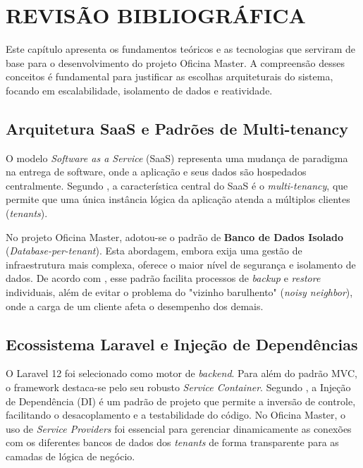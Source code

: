 
\chapter{REVISÃO BIBLIOGRÁFICA}
\label{cap:revisao-bibliografica}

Este capítulo apresenta os fundamentos teóricos e as tecnologias que serviram de base para o desenvolvimento do projeto Oficina Master. A compreensão desses conceitos é fundamental para justificar as escolhas arquiteturais do sistema, focando em escalabilidade, isolamento de dados e reatividade.

\section{Arquitetura SaaS e Padrões de Multi-tenancy}

O modelo \textit{Software as a Service} (SaaS) representa uma mudança de paradigma na entrega de software, onde a aplicação e seus dados são hospedados centralmente. Segundo , a característica central do SaaS é o \textit{multi-tenancy}, que permite que uma única instância lógica da aplicação atenda a múltiplos clientes (\textit{tenants}).

No projeto Oficina Master, adotou-se o padrão de \textbf{Banco de Dados Isolado} (\textit{Database-per-tenant}). Esta abordagem, embora exija uma gestão de infraestrutura mais complexa, oferece o maior nível de segurança e isolamento de dados. De acordo com , esse padrão facilita processos de \textit{backup} e \textit{restore} individuais, além de evitar o problema do "vizinho barulhento" (\textit{noisy neighbor}), onde a carga de um cliente afeta o desempenho dos demais.

\section{Ecossistema Laravel e Injeção de Dependências}

O Laravel 12 foi selecionado como motor de \textit{backend}. Para além do padrão MVC, o framework destaca-se pelo seu robusto \textit{Service Container}. Segundo , a Injeção de Dependência (DI) é um padrão de projeto que permite a inversão de controle, facilitando o desacoplamento e a testabilidade do código. No Oficina Master, o uso de \textit{Service Providers} foi essencial para gerenciar dinamicamente as conexões com os diferentes bancos de dados dos \textit{tenants} de forma transparente para as camadas de lógica de negócio.

